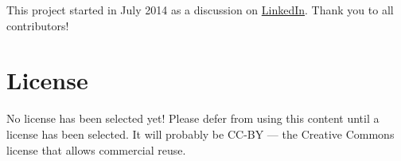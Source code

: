 This project started in July 2014 as a discussion on \href{https://www.linkedin.com/groupItem?commentID=-1&item=5890782095432781827&type=member&gid=128312&view=}{LinkedIn}.  Thank you to all contributors!

\section{License}

No license has been selected yet! Please defer from using this content until a license has been selected.  It will probably be CC-BY --- the Creative Commons license that allows commercial reuse.


